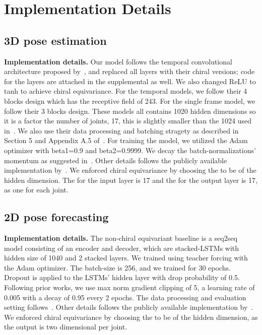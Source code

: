 \documentclass{article}
\begin{document}
\section{Implementation Details}\label{extra_implement}
\subsection{3D pose estimation}
\textbf{Implementation details.}
Our model follows the temporal convolutional architecture proposed by~\citet{pavllo20193d}, and replaced all layers with their chiral versions; code for the layers are attached in the supplemental as well.
We also changed ReLU to tanh to achieve chiral equivariance. For the temporal models, we follow their 4 blocks design which has the receptive field of 243. For the single frame model, we follow their 3 blocks design. These models all contains 1020 hidden dimensions so it is a factor the number of joints, 17, this is slightly smaller than the 1024 used in~\cite{pavllo20193d}. We also use their data processing and batching stragety as described in Section 5 and Appendix A.5 of~\cite{pavllo20193d}. For training the model, we utilized the Adam optimizer with beta1=0.9 and beta2=0.9999. We decay the batch-normalizations' momentum as suggested in~\cite{pavllo20193d}. Other details follows the publicly available implementation by~\citet{pavllo20193d}.  We enforced chiral equivariance by choosing the  to be  of the hidden dimension. The  for the input layer is 17 and the  for the output layer is 17, as one for each joint.

\subsection{2D pose forecasting}
\textbf{Implementation details.}
The non-chiral equivariant baseline is a seq2seq model consisting of an encoder and decoder, which are stacked-LSTMs with hidden size of 1040 and 2 stacked layers. We trained using teacher forcing with the Adam optimizer. The batch-size is 256, and we trained for 30 epochs. Dropout is applied to the LSTMs' hidden layer with drop probability of 0.5. Following prior works, we use max norm gradient clipping of 5, a learning rate of 0.005 with a decay of 0.95 every 2 epochs. The data processing and evaluation setting follows~\cite{chiu2019action}. Other details follows the publicly available implementation by~\citet{chiu2019action}. We enforced chiral equivariance by choosing the  to be  of the hidden dimension, as the output is two dimensional per joint.
\end{document}

